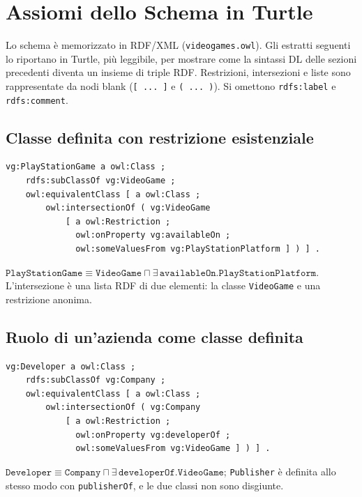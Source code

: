 \section{Assiomi dello Schema in Turtle}
\label{sec:app_turtle}

Lo schema \`e memorizzato in RDF/XML (\texttt{videogames.owl}). Gli estratti seguenti
lo riportano in Turtle, pi\`u leggibile, per mostrare come la sintassi DL delle sezioni
precedenti diventa un insieme di triple RDF. Restrizioni, intersezioni e liste sono
rappresentate da nodi blank (\texttt{[ ... ]} e \texttt{( ... )}). Si omettono
\texttt{rdfs:label} e \texttt{rdfs:comment}.

\subsection*{Classe definita con restrizione esistenziale}

\begin{lstlisting}[style=turtle]
vg:PlayStationGame a owl:Class ;
    rdfs:subClassOf vg:VideoGame ;
    owl:equivalentClass [ a owl:Class ;
        owl:intersectionOf ( vg:VideoGame
            [ a owl:Restriction ;
              owl:onProperty vg:availableOn ;
              owl:someValuesFrom vg:PlayStationPlatform ] ) ] .
\end{lstlisting}

$\texttt{PlayStationGame} \equiv \texttt{VideoGame} \sqcap \exists\,\texttt{availableOn.PlayStationPlatform}$.
L'intersezione \`e una lista RDF di due elementi: la classe \texttt{VideoGame} e
una restrizione anonima.

\subsection*{Ruolo di un'azienda come classe definita}

\begin{lstlisting}[style=turtle]
vg:Developer a owl:Class ;
    rdfs:subClassOf vg:Company ;
    owl:equivalentClass [ a owl:Class ;
        owl:intersectionOf ( vg:Company
            [ a owl:Restriction ;
              owl:onProperty vg:developerOf ;
              owl:someValuesFrom vg:VideoGame ] ) ] .
\end{lstlisting}

$\texttt{Developer} \equiv \texttt{Company} \sqcap \exists\,\texttt{developerOf.VideoGame}$; \texttt{Publisher} \`e
definita allo stesso modo con \texttt{publisherOf}, e le due classi non sono disgiunte.

